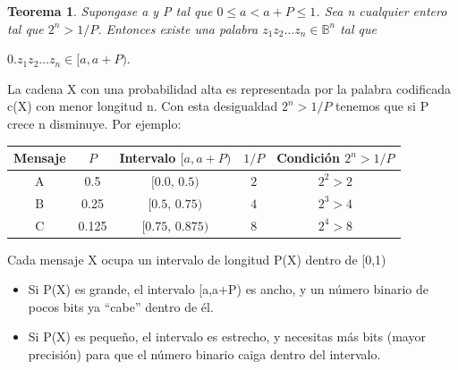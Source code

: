 \documentclass{beamer}
\theoremstyle{plain}
\newtheorem{teorema} [Teorema] {Teorema}
\theoremstyle{example}
\theoremstyle{example}
\begin{document}
\begin{frame}  \footnotesize 



\begin{teorema}\label{th:Intervalo}
Supongase a y P tal que $0 \leq a < a + P \leq 1$. Sea n cualquier entero tal que $2^n>1/P$. Entonces existe una palabra $z_1 z_2 \ldots z_n \in \mathbb{B}^n$ tal que 

\begin{center}
$0.z_1z_2 \ldots z_n \in [a,a+P).$
\end{center}

\end{teorema}

La cadena X con una probabilidad alta es representada por la palabra codificada c(X) con menor
longitud n. Con esta desigualdad $2^n>1/P$ tenemos que si P crece n disminuye. Por ejemplo:

\begin{table}[!htbp]
\centering
\begin{tabular}{c c c c c}
\toprule
\textbf{Mensaje} & \textbf{$P$} & \textbf{Intervalo $[a, a+P)$} & \textbf{$1/P$} & \textbf{Condición $2^n > 1/P$} \\
\midrule
A & 0.5   & $[0.0,\, 0.5)$   & $2$ & $2^2 > 2$ \\
B & 0.25  & $[0.5,\, 0.75)$  & $4$ & $2^3 > 4$ \\
C & 0.125 & $[0.75,\, 0.875)$ & $8$ & $2^4 > 8$ \\
\bottomrule
\end{tabular}
\end{table}

Cada mensaje X ocupa un intervalo de longitud P(X) dentro de [0,1)
\begin{itemize}
    \item Si P(X) es grande, el intervalo [a,a+P) es ancho, y un número binario de pocos bits ya ``cabe'' dentro de él.

 \item  Si P(X) es pequeño, el intervalo es estrecho, y necesitas más bits (mayor precisión) para que el número binario caiga dentro del intervalo.
\end{itemize}


\end{frame} 
\end{document}
